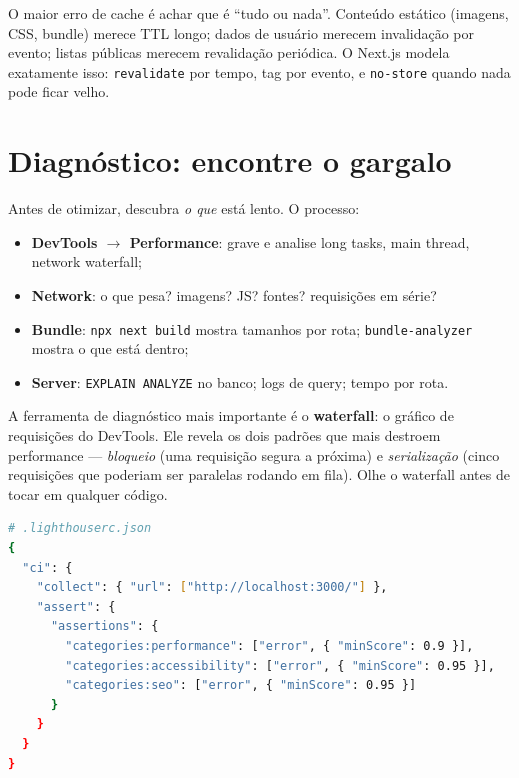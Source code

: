 \begin{caixadica}
O maior erro de cache é achar que é ``tudo ou nada''. Conteúdo estático
(imagens, CSS, bundle) merece TTL longo; dados de usuário merecem
invalidação por evento; listas públicas merecem revalidação periódica. O
Next.js modela exatamente isso: \texttt{revalidate} por tempo, tag por
evento, e \texttt{no-store} quando nada pode ficar velho.
\end{caixadica}

\section{Diagnóstico: encontre o gargalo}

Antes de otimizar, descubra \emph{o que} está lento. O processo:

\begin{itemize}[leftmargin=*, itemsep=0.4em]
  \item \textbf{DevTools $\rightarrow$ Performance}: grave e analise long tasks, main thread, network waterfall;
  \item \textbf{Network}: o que pesa? imagens? JS? fontes? requisições em série?
  \item \textbf{Bundle}: \texttt{npx next build} mostra tamanhos por rota; \texttt{bundle-analyzer} mostra o que está dentro;
  \item \textbf{Server}: \texttt{EXPLAIN ANALYZE} no banco; logs de query; tempo por rota.
\end{itemize}

\begin{caixaconceito}
A ferramenta de diagnóstico mais importante é o \textbf{waterfall}: o gráfico
de requisições do DevTools. Ele revela os dois padrões que mais destroem
performance — \emph{bloqueio} (uma requisição segura a próxima) e
\emph{serialização} (cinco requisições que poderiam ser paralelas rodando em
fila). Olhe o waterfall antes de tocar em qualquer código.
\end{caixaconceito}

\begin{lstlisting}[style=livro, language=Bash,
  caption={Orçamento de performance no CI (Lighthouse CI).},
  label={list:perf-budget}]
# .lighthouserc.json
{
  "ci": {
    "collect": { "url": ["http://localhost:3000/"] },
    "assert": {
      "assertions": {
        "categories:performance": ["error", { "minScore": 0.9 }],
        "categories:accessibility": ["error", { "minScore": 0.95 }],
        "categories:seo": ["error", { "minScore": 0.95 }]
      }
    }
  }
}
\end{lstlisting}

